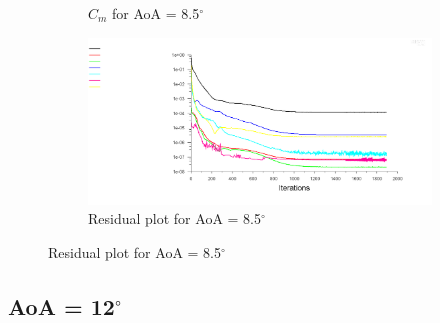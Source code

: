 \begin{figure}[H]
\begin{subfigure}[b]{0.5\textwidth}
    \caption{$C_m$ for AoA = 8.5$^\circ$}
    \label{fig:aoa_8.5_cm}
  \end{subfigure}
  \begin{subfigure}[b]{0.5\textwidth}
    \includegraphics[width=\textwidth]{8.5_deg/AoA_8_5_resid.png}
    \caption{Residual plot for AoA = 8.5$^\circ$}
    \label{fig:aoa_8.5_resid}
  \end{subfigure}
\end{figure}

\subsection*{AoA = 12$^\circ$}

